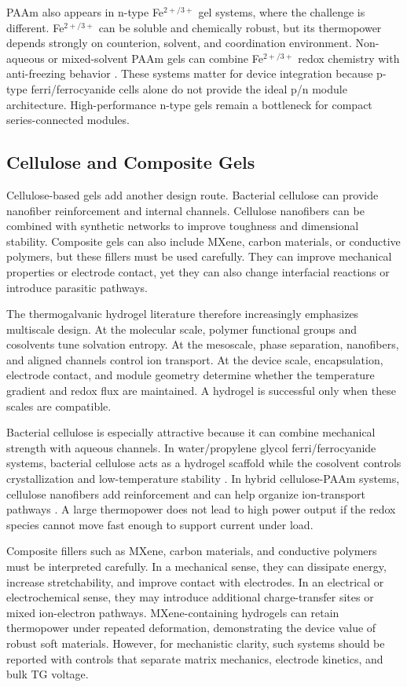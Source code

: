 PAAm also appears in n-type Fe$^{2+/3+}$ gel systems, where the challenge is
different. Fe$^{2+/3+}$ can be soluble and chemically robust, but its
thermopower depends strongly on counterion, solvent, and coordination
environment. Non-aqueous or mixed-solvent PAAm gels can combine Fe$^{2+/3+}$
redox chemistry with anti-freezing behavior \citep{liu2024subzero}. These systems matter for device
integration because p-type ferri/ferrocyanide cells alone do not provide the
ideal p/n module architecture. High-performance n-type gels remain a bottleneck
for compact series-connected modules.

\subsection{Cellulose and Composite Gels}

Cellulose-based gels add another design route. Bacterial cellulose can provide
nanofiber reinforcement and internal channels. Cellulose nanofibers can be
combined with synthetic networks to improve toughness and dimensional stability.
Composite gels can also include MXene, carbon materials, or conductive
polymers, but these fillers must be used carefully. They can improve mechanical
properties or electrode contact, yet they can also change interfacial reactions
or introduce parasitic pathways.

The thermogalvanic hydrogel literature therefore increasingly emphasizes
multiscale design. At the molecular scale, polymer functional groups and
cosolvents tune solvation entropy. At the mesoscale, phase separation,
nanofibers, and aligned channels control ion transport. At the device scale,
encapsulation, electrode contact, and module geometry determine whether the
temperature gradient and redox flux are maintained. A hydrogel is successful
only when these scales are compatible.

Bacterial cellulose is especially attractive because it can combine mechanical
strength with aqueous channels. In water/propylene glycol ferri/ferrocyanide
systems, bacterial cellulose acts as a hydrogel scaffold while the cosolvent
controls crystallization and low-temperature stability \citep{yin2023bacterial}.
In hybrid cellulose-PAAm systems, cellulose nanofibers add reinforcement and can
help organize ion-transport pathways \citep{lin2024triple}.
A large thermopower does not lead to high power output if the redox species
cannot move fast enough to support current under load.

Composite fillers such as MXene, carbon materials, and conductive polymers must
be interpreted carefully. In a mechanical sense, they can dissipate energy,
increase stretchability, and improve contact with electrodes. In an electrical
or electrochemical sense, they may introduce additional charge-transfer sites or
mixed ion-electron pathways. MXene-containing hydrogels can retain thermopower
under repeated deformation, demonstrating the device value of robust soft
materials. However, for mechanistic clarity, such systems should
be reported with controls that separate matrix mechanics, electrode kinetics,
and bulk TG voltage.

